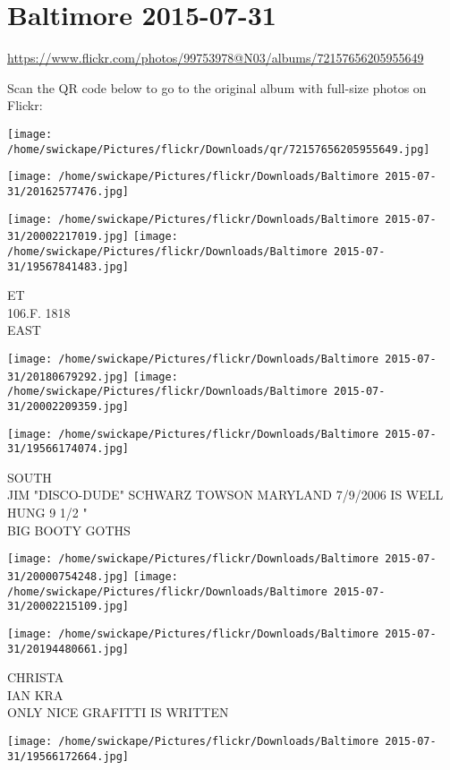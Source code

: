 \documentclass[10pt,letterpaper]{article}
\title{}
\author{}
\date{}
\begin{document}
\section*{Baltimore 2015-07-31}

\url{https://www.flickr.com/photos/99753978@N03/albums/72157656205955649}

Scan the QR code below to go to the original album with full-size photos on Flickr:

\texttt{[image: /home/swickape/Pictures/flickr/Downloads/qr/72157656205955649.jpg]}
\pagebreak

\texttt{[image: /home/swickape/Pictures/flickr/Downloads/Baltimore 2015-07-31/20162577476.jpg]}

\vspace{0.25in}
\texttt{[image: /home/swickape/Pictures/flickr/Downloads/Baltimore 2015-07-31/20002217019.jpg]}
\texttt{[image: /home/swickape/Pictures/flickr/Downloads/Baltimore 2015-07-31/19567841483.jpg]}

ET\\
106.F. 1818\\
EAST
\pagebreak

\texttt{[image: /home/swickape/Pictures/flickr/Downloads/Baltimore 2015-07-31/20180679292.jpg]}
\texttt{[image: /home/swickape/Pictures/flickr/Downloads/Baltimore 2015-07-31/20002209359.jpg]}

\vspace{0.25in}
\texttt{[image: /home/swickape/Pictures/flickr/Downloads/Baltimore 2015-07-31/19566174074.jpg]}

SOUTH\\
JIM "DISCO{-}DUDE" SCHWARZ TOWSON MARYLAND 7/9/2006 IS WELL HUNG 9 1/2 "\\
BIG BOOTY GOTHS
\pagebreak

\texttt{[image: /home/swickape/Pictures/flickr/Downloads/Baltimore 2015-07-31/20000754248.jpg]}
\texttt{[image: /home/swickape/Pictures/flickr/Downloads/Baltimore 2015-07-31/20002215109.jpg]}

\texttt{[image: /home/swickape/Pictures/flickr/Downloads/Baltimore 2015-07-31/20194480661.jpg]}

CHRISTA\\
IAN KRA\\
ONLY NICE GRAFITTI IS WRITTEN
\pagebreak

\texttt{[image: /home/swickape/Pictures/flickr/Downloads/Baltimore 2015-07-31/19566172664.jpg]}
\end{document}
